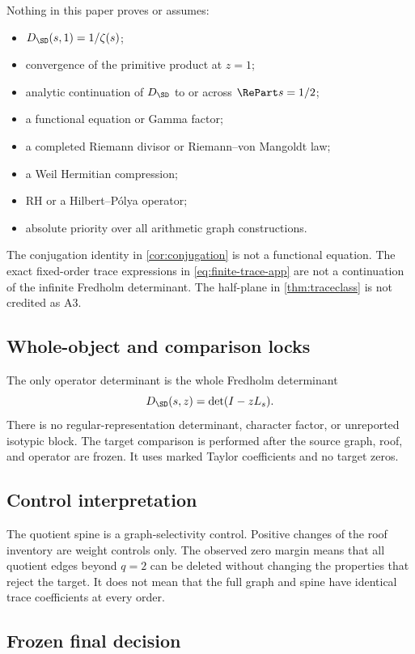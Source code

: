 Nothing in this paper proves or assumes:

\begin{itemize}
  \item \(D_{\SD}(s,1)=1/\zeta(s)\);
  \item convergence of the primitive product at \(z=1\);
  \item analytic continuation of \(D_{\SD}\) to or across
  \(\RePart s=1/2\);
  \item a functional equation or Gamma factor;
  \item a completed Riemann divisor or Riemann--von Mangoldt law;
  \item a Weil Hermitian compression;
  \item RH or a Hilbert--Pólya operator;
  \item absolute priority over all arithmetic graph constructions.
\end{itemize}

The conjugation identity in \cref{cor:conjugation} is not a functional
equation.  The exact fixed-order trace expressions in
\cref{eq:finite-trace-app} are not a continuation of the infinite Fredholm
determinant.  The half-plane in \cref{thm:traceclass} is not credited as A3.

\subsection{Whole-object and comparison locks}

The only operator determinant is the whole Fredholm determinant
\[
 D_{\SD}(s,z)=\det(I-zL_s).
\]
There is no regular-representation determinant, character factor, or
unreported isotypic block.  The target comparison is performed after the
source graph, roof, and operator are frozen.  It uses marked Taylor
coefficients and no target zeros.

\subsection{Control interpretation}

The quotient spine is a graph-selectivity control.  Positive changes of the
roof inventory are weight controls only.  The observed zero margin means
that all quotient edges beyond \(q=2\) can be deleted without changing the
properties that reject the target.  It does not mean that the full graph and
spine have identical trace coefficients at every order.

\subsection{Frozen final decision}

